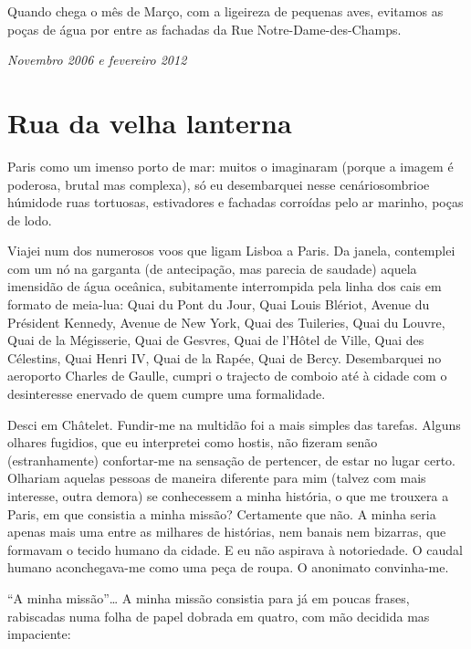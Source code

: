 Quando chega o mês de Março, com a ligeireza de pequenas aves,
evitamos as poças de água por entre as fachadas da Rue
Notre-Dame-des-Champs.

\begin{flushright}
\emph{Novembro 2006 e fevereiro 2012}
\end{flushright}

\chapter{Rua da velha lanterna}

Paris como um imenso porto de mar: muitos o imaginaram (porque a imagem é
poderosa, brutal mas complexa), só eu desembarquei nesse cenáriosombrioe
húmidode ruas tortuosas, estivadores e fachadas corroídas pelo ar
marinho, poças de lodo.

Viajei num dos numerosos voos que ligam Lisboa a Paris. Da janela,
contemplei com um nó na garganta (de antecipação, mas parecia de
saudade) aquela imensidão de água oceânica, subitamente interrompida
pela linha dos cais em formato de meia-lua: Quai du Pont du Jour, Quai
Louis Blériot, Avenue du Président Kennedy, Avenue de New York, Quai des
Tuileries, Quai du Louvre, Quai de la Mégisserie, Quai de Gesvres, Quai
de l'Hôtel de Ville, Quai des Célestins, Quai Henri IV, Quai de la
Rapée, Quai de Bercy. Desembarquei no aeroporto Charles de Gaulle,
cumpri o trajecto de comboio até à cidade com o desinteresse enervado de
quem cumpre uma formalidade.

Desci em Châtelet. Fundir-me na multidão foi a mais simples das tarefas.
Alguns olhares fugidios, que eu interpretei como hostis, não fizeram
senão (estranhamente) confortar-me
na sensação de pertencer, de estar no lugar certo. Olhariam aquelas
pessoas de maneira diferente para mim (talvez com mais interesse, outra
demora) se conhecessem a minha história, o que me trouxera a Paris, em
que consistia a minha missão? Certamente que não. A minha seria apenas
mais uma entre as milhares de histórias, nem banais nem bizarras, que
formavam o tecido humano da cidade. E eu não aspirava à notoriedade. O
caudal humano aconchegava-me como uma peça de roupa. O anonimato
convinha-me.

``A minha missão''\ldots{} A minha missão consistia para já em poucas
frases, rabiscadas numa folha de papel dobrada em quatro, com mão
decidida mas impaciente:

